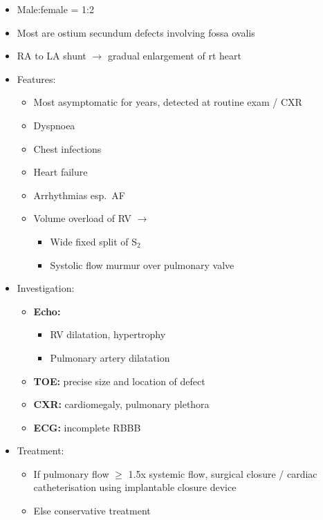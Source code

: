 \documentclass[
  12pt,
]{memoir}
\providecommand{\tightlist}{%
  \setlength{\itemsep}{0pt}\setlength{\parskip}{0pt}}
\begin{document}
\begin{itemize}
\tightlist
\item
  Male:female = 1:2
\item
  Most are ostium secundum defects involving fossa ovalis
\item
  RA to LA shunt \(\rightarrow\) gradual enlargement of rt heart
\item
  Features:

  \begin{itemize}
  \tightlist
  \item
    Most asymptomatic for years, detected at routine exam / CXR
  \item
    Dyspnoea
  \item
    Chest infections
  \item
    Heart failure
  \item
    Arrhythmias esp.~AF
  \item
    Volume overload of RV \(\rightarrow\)

    \begin{itemize}
    \tightlist
    \item
      Wide fixed split of S\(_2\)
    \item
      Systolic flow murmur over pulmonary valve
    \end{itemize}
  \end{itemize}
\item
  Investigation:

  \begin{itemize}
  \tightlist
  \item
    \textbf{Echo:}

    \begin{itemize}
    \tightlist
    \item
      RV dilatation, hypertrophy
    \item
      Pulmonary artery dilatation
    \end{itemize}
  \item
    \textbf{TOE:} precise size and location of defect
  \item
    \textbf{CXR:} cardiomegaly, pulmonary plethora
  \item
    \textbf{ECG:} incomplete RBBB
  \end{itemize}
\item
  Treatment:

  \begin{itemize}
  \tightlist
  \item
    If pulmonary flow \(\ge\) 1.5x systemic flow, surgical closure /
    cardiac catheterisation using implantable closure device
  \item
    Else conservative treatment
  \end{itemize}
\end{itemize}
\end{document}
